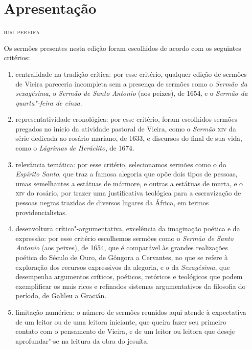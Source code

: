 \chapter{Apresentação}

\begin{flushright}
\textsc{iuri pereira}
\end{flushright}\bigskip

\noindent{}Os sermões presentes nesta edição foram escolhidos de acordo com os
seguintes critérios:

\begin{enumerate}
\item centralidade na tradição crítica: por esse critério, qualquer edição
de sermões de Vieira pareceria incompleta sem a presença de sermões como
o \emph{Sermão da sexagésima}, o \emph{Sermão de Santo Antonio} (aos
peixes), de 1654, e o \emph{Sermão da quarta"-feira de cinza}.

\item representatividade cronológica: por esse critério, foram escolhidos
sermões pregados no início da atividade pastoral de Vieira, como o
\emph{Sermão} \textsc{xiv} da série dedicada ao rosário mariano, de 1633, e
discursos do final de sua vida, como o \emph{Lágrimas de Heráclito}, de
1674.

\item relevância temática: por esse critério, selecionamos sermões como o
do \emph{Espírito Santo}, que traz a famosa alegoria que opõe dois tipos
de pessoas, umas semelhantes a estátuas de mármore, e outras a estátuas
de murta, e o \textsc{xiv} do rosário, por trazer uma justificativa teológica
para a escravização de pessoas negras trazidas de diversos lugares da
África, em termos providencialistas.

\item desenvoltura crítico"-argumentativa, excelência da imaginação poética
e da expressão: por esse critério escolhemos sermões como o \emph{Sermão
de Santo Antonio} (aos peixes), de 1654, que é comparável às grandes
realizações poética do Século de Ouro, de Gôngora a Cervantes, no que se
refere à exploração dos recursos expressivos da alegoria, e o da
\emph{Sexagésima}, que desempenha argumentos críticos, poéticos,
retóricos e teológicos que podem exemplificar os mais ricos e refinados
sistemas argumentativos da filosofia do período, de Galileu a Gracián.

\item limitação numérica: o número de sermões reunidos aqui atende à
expectativa de um leitor ou de uma leitora iniciante, que queira fazer
seu primeiro contato com o pensamento de Vieira, e de um leitor ou
leitora que deseje aprofundar"-se na leitura da obra do jesuíta.
\end{enumerate}

